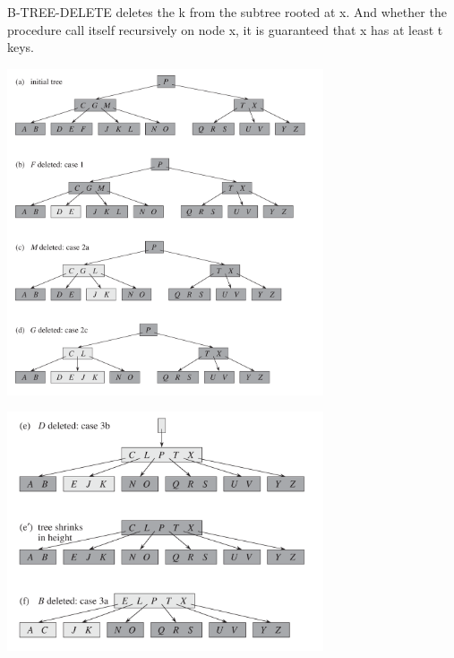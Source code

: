     B-TREE-DELETE deletes the k from the subtree rooted at x. And whether 
    the procedure call itself recursively on node x, it is guaranteed that 
    x has at least t keys.




    \includegraphics[width=0.7\textwidth]{contents/Advanced_Data_Structure/B_Tree/Images/case_abcd.png}

    \includegraphics[width=0.7\textwidth]{contents/Advanced_Data_Structure/B_Tree/Images/deletion_ef.png}

